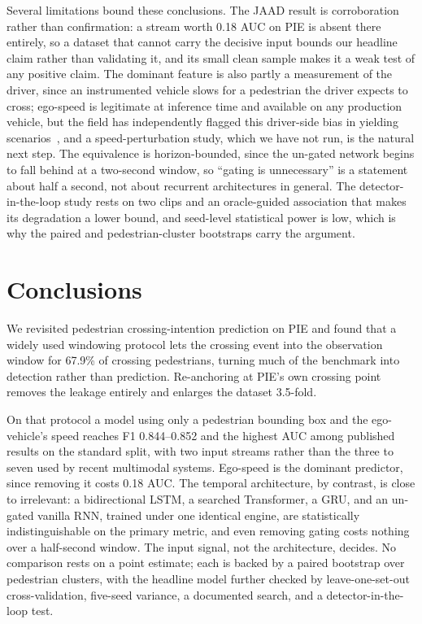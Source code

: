 \documentclass[mti,article,submit,moreauthors]{Definitions/mdpi}
\begin{document}
Several limitations bound these conclusions. The JAAD result is corroboration rather than confirmation: a stream worth 0.18 AUC on PIE is absent there entirely, so a dataset that cannot carry the decisive input bounds our headline claim rather than validating it, and its small clean sample makes it a weak test of any positive claim. The dominant feature is also partly a measurement of the driver, since an instrumented vehicle slows for a pedestrian the driver expects to cross; ego-speed is legitimate at inference time and available on any production vehicle, but the field has independently flagged this driver-side bias in yielding scenarios~\citep{azarmi2024featureimportance}, and a speed-perturbation study, which we have not run, is the natural next step. The equivalence is horizon-bounded, since the un-gated network begins to fall behind at a two-second window, so ``gating is unnecessary'' is a statement about half a second, not about recurrent architectures in general. The detector-in-the-loop study rests on two clips and an oracle-guided association that makes its degradation a lower bound, and seed-level statistical power is low, which is why the paired and pedestrian-cluster bootstraps carry the argument.

\section{Conclusions}
\label{sec:conclusions}

We revisited pedestrian crossing-intention prediction on PIE and found that a widely used windowing protocol lets the crossing event into the observation window for 67.9\% of crossing pedestrians, turning much of the benchmark into detection rather than prediction. Re-anchoring at PIE's own crossing point removes the leakage entirely and enlarges the dataset 3.5-fold.

On that protocol a model using only a pedestrian bounding box and the ego-vehicle's speed reaches F1 0.844--0.852 and the highest AUC among published results on the standard split, with two input streams rather than the three to seven used by recent multimodal systems. Ego-speed is the dominant predictor, since removing it costs 0.18 AUC. The temporal architecture, by contrast, is close to irrelevant: a bidirectional LSTM, a searched Transformer, a GRU, and an un-gated vanilla RNN, trained under one identical engine, are statistically indistinguishable on the primary metric, and even removing gating costs nothing over a half-second window. The input signal, not the architecture, decides. No comparison rests on a point estimate; each is backed by a paired bootstrap over pedestrian clusters, with the headline model further checked by leave-one-set-out cross-validation, five-seed variance, a documented search, and a detector-in-the-loop test.
\end{document}
